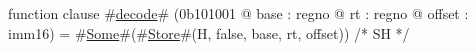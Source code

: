 function clause #\hyperref[zdecode]{decode}# (0b101001 @ base : regno @ rt : regno @ offset : imm16) =
  #\hyperref[zSome]{Some}#(#\hyperref[zStore]{Store}#(H, false, base, rt, offset)) /* SH */
